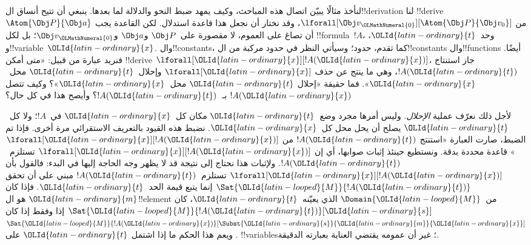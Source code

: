 \documentclass[../../../include/open-logic-section]{subfiles}
\begin{document}


لنأخذ مثالًا يبيّن اتصال هذه المباحث، وكيف يمهد ضبط النحو والدلالة
لما بعدها. ينبغي أن تتيح أنساق ال!!{derivation} لنا
!!{derive} $\Atom{\Obj P}{\Obj a}$ من
$\lforall[\Obj v_\OLMathNumeral{0}][\Atom{\Obj P}{\Obj v_0}]$، وقد نختار أن
نجعل هذا قاعدة استدلال. لكن القاعدة يجب أن تصاغ على العموم،
لا مقصورة على~$\Obj P$ و$\Obj a$ و$\Obj v_\OLMathNumeral{0}$؛ بل لكل
!!{formula}~$!A$، وحد~$\OLId{latin-ordinary}{t}$، و!!{variable}~$\OLId{latin-ordinary}{x}$. وال!!{constant}s،
كما تقدم، حدود؛ وسيأتي النظر في حدود مركبة من
ال!!{constant}s وال!!{function}s أيضًا. فنريد عبارة من قبيل:
«متى أمكن !!{derive} $\lforall[\OLId{latin-ordinary}{x}][!A(\OLId{latin-ordinary}{x})]$، جاز استنتاج
$!A(\OLId{latin-ordinary}{t})$، وهي ما ينتج عن حذف $\lforall[\OLId{latin-ordinary}{x}]$ وإحلال~$\OLId{latin-ordinary}{t}$
محل~$\OLId{latin-ordinary}{x}$». فما حقيقة «إحلال $\OLId{latin-ordinary}{t}$ محل~$\OLId{latin-ordinary}{x}$»؟ وكيف تتصل
$!A(\OLId{latin-ordinary}{x})$ بـ~$!A(\OLId{latin-ordinary}{t})$؟ وأيصح هذا في كل حال؟

لأجل ذلك نعرّف عملية \emph{الإحلال}. وليس أمرها مجرد وضع~$\OLId{latin-ordinary}{t}$
مكان كل~$\OLId{latin-ordinary}{x}$ في~$!A$؛ ولا كل~$\OLId{latin-ordinary}{t}$ يصلح أن يحل محل كل~$\OLId{latin-ordinary}{x}$.
نضبط هذه القيود بالتعريف الاستقرائي مرة أخرى. فإذا تم الضبط،
صارت العبارة «استنتج $!A(\OLId{latin-ordinary}{t})$ من $\lforall[\OLId{latin-ordinary}{x}][!A(\OLId{latin-ordinary}{x})]$» قاعدة
محددة بدقة. ونستطيع حينئذ إثبات صوابها، أي إن
$\lforall[\OLId{latin-ordinary}{x}][!A(\OLId{latin-ordinary}{x})]$ تستلزم~$!A(\OLId{latin-ordinary}{t})$. ولإثبات هذا نحتاج إلى
نتيجة قد لا يظهر وجه الحاجة إليها في البدء: فالقول بأن
$\lforall[\OLId{latin-ordinary}{x}][!A(\OLId{latin-ordinary}{x})]$ تستلزم~$!A(\OLId{latin-ordinary}{t})$ مبني على أن تحقق
$\Sat{\OLId{latin-looped}{M}}{!A(\OLId{latin-ordinary}{t})}$ إنما يتبع قيمة الحد~$\OLId{latin-ordinary}{t}$. فإذا كان $\OLId{latin-ordinary}{m}$
هو ال!!{element} من~$\Domain{\OLId{latin-looped}{M}}$ الذي يعيّنه~$\OLId{latin-ordinary}{t}$، كان
$\Sat{\OLId{latin-looped}{M}}{!A(\OLId{latin-ordinary}{t})}[\OLId{latin-ordinary}{s}]$ إذا وفقط إذا كان
$\Sat{\OLId{latin-looped}{M}}{!A(\OLId{latin-ordinary}{x})}[\Subst{\OLId{latin-ordinary}{s}}{\OLId{latin-ordinary}{m}}{\OLId{latin-ordinary}{x}}]$. ويعم هذا الحكم ما إذا
اشتمل $\OLId{latin-ordinary}{t}$ على !!{variable}s؛ غير أن عمومه يقتضي العناية
بعبارته الدقيقة.
\end{document}
